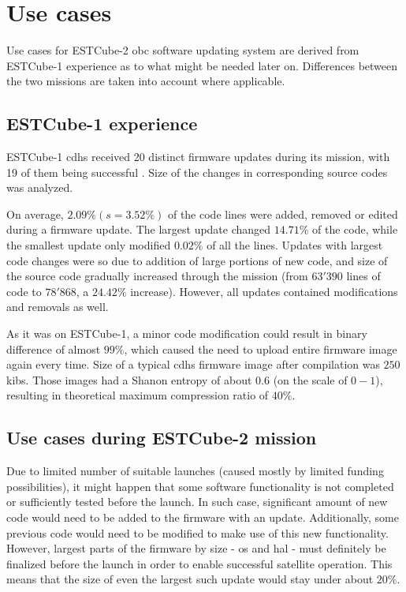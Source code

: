 \newpage
\section{Use cases}

Use cases for ESTCube-2 \gls{obc} software updating system are derived from ESTCube-1 experience as to what might be needed later on. Differences between the two missions are taken into account where applicable.

\subsection{ESTCube-1 experience}

ESTCube-1 \gls{cdhs} received 20 distinct firmware updates during its mission, with 19 of them being successful \cite{Suenter2016}. Size of the changes in corresponding source codes was analyzed.

On average, $2.09\% (s=3.52\%)$ of the code lines were added, removed or edited during a firmware update. The largest update changed $14.71\%$ of the code, while the smallest update only modified $0.02\%$ of all the lines. Updates with largest code changes were so due to addition of large portions of new code, and size of the source code gradually increased through the mission (from $63'390$ lines of code to $78'868$, a $24.42\%$ increase). However, all updates contained modifications and removals as well.

As it was on ESTCube-1, a minor code modification could result in binary difference of almost $99\%$, which caused the need to upload entire firmware image again every time. Size of a typical \gls{cdhs} firmware image after compilation was $250$ \glspl{kib}. Those images had a Shanon entropy of about $0.6$ (on the scale of $0-1$), resulting in theoretical maximum compression ratio of $40\%$. \cite{Suenter2016}

\subsection{Use cases during ESTCube-2 mission}

Due to limited number of suitable launches (caused mostly by limited funding possibilities), it might happen that some software functionality is not completed or sufficiently tested before the launch. In such case, significant amount of new code would need to be added to the firmware with an update. Additionally, some previous code would need to be modified to make use of this new functionality. However, largest parts of the firmware by size - \gls{os} and \gls{hal} - must definitely be finalized before the launch in order to enable successful satellite operation. This means that the size of even the largest such update would stay under about $20\%$.

